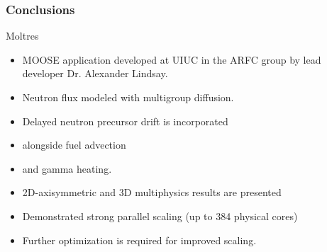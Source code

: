 \begin{frame}
  \frametitle{Conclusions}
		\begin{block}{Moltres}
		\begin{itemize}
                        \item \gls{MOOSE} application developed at \gls{UIUC} 
                                in the \gls{ARFC} group by lead developer Dr. 
                                Alexander Lindsay.
                        \item Neutron flux modeled with multigroup diffusion.
                        \item Delayed neutron precursor drift is incorporated
                        \item alongside fuel advection
                        \item and gamma heating.
                        \item 2D-axisymmetric and 3D multiphysics results are presented
                        \item Demonstrated strong parallel scaling (up to 384 physical cores) 
                \item Further optimization is required for improved scaling.
        \end{itemize}
        \end{block}
        
\end{frame}

